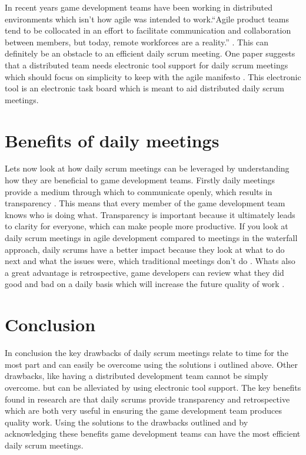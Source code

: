\documentclass{scrartcl}
\begin{document}
In recent years game development teams have been working in distributed environments which isn't how agile was intended to work.``Agile product teams tend to be collocated in an effort to facilitate communication and collaboration between
members, but today, remote workforces are a reality.'' \cite{Distributed}. This can definitely be an obstacle to an efficient daily scrum meeting. One paper suggests that a distributed team needs electronic tool support for daily scrum meetings which should focus on simplicity to keep with the agile manifesto \cite{Manifesto,SupportingScrum}. This electronic tool is an electronic task board which is meant to aid distributed daily scrum meetings.   

\section{Benefits of daily meetings}

Lets now look at how daily scrum meetings can be leveraged by understanding how they are beneficial to game development teams. Firstly daily meetings provide a medium through which to communicate openly, which results in transparency \cite{Emergence}. This means that every member of the game development team knows who is doing what. Transparency is important because it ultimately leads to clarity for everyone, which can make people more productive. If you look at daily scrum meetings in agile development compared to meetings in the waterfall approach, daily scrums have a better impact because they look at what to do next and what the issues were, which traditional meetings don't do \cite{Emergence}. Whats also a great advantage is retrospective, game developers can review what they did good and bad on a daily basis which will increase the future quality of work \cite{Emergence}.

\section{Conclusion}

In conclusion the key drawbacks of daily scrum meetings relate to time for the most part and can easily be overcome using the solutions i outlined above. Other drawbacks, like having a distributed development team cannot be simply overcome. but can be alleviated by using electronic tool support. The key benefits found in research are that daily scrums provide transparency and retrospective which are both very useful in ensuring the game development team produces quality work. Using the solutions to the drawbacks outlined and by acknowledging these benefits game development teams can have the most efficient daily scrum meetings.   



\end{document}
